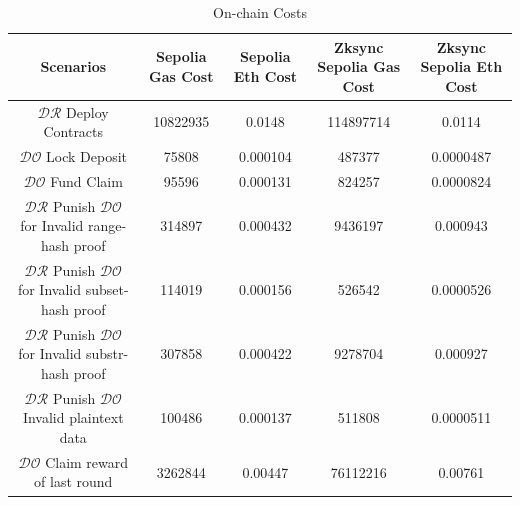 \documentclass[journal]{IEEEtran}
\begin{document}
\begin{table}[htbp]
    \centering
    \caption{On-chain Costs }
    \label{tab_gas_cost}
    \begin{tabular}{c|c|c|c|c}
    \hline
    Scenarios   & Sepolia Gas Cost & Sepolia Eth Cost & Zksync Sepolia Gas Cost & Zksync Sepolia Eth Cost \\
    \hline 

    $\mathcal{DR}$ Deploy Contracts & 10822935 & 0.0148 & 114897714 & 0.0114 \\

    $\mathcal{DO}$ Lock Deposit & 75808 & 0.000104 & 487377 & 0.0000487 \\

    $\mathcal{DO}$ Fund Claim & 95596 & 0.000131 & 824257 & 0.0000824 \\
      
    $\mathcal{DR}$ Punish $\mathcal{DO}$ for Invalid range-hash proof   & 314897 & 0.000432 & 9436197 & 0.000943 \\ 
    $\mathcal{DR}$ Punish $\mathcal{DO}$ for Invalid subset-hash proof   & 114019 & 0.000156 & 526542 & 0.0000526 \\ 
    $\mathcal{DR}$ Punish $\mathcal{DO}$ for Invalid substr-hash proof   & 307858 & 0.000422 & 9278704 & 0.000927 \\ 

    $\mathcal{DR}$ Punish $\mathcal{DO}$ Invalid plaintext data & 100486 & 0.000137 & 511808 & 0.0000511 \\

    $\mathcal{DO}$ Claim reward of last round & 3262844 & 0.00447 & 76112216 & 0.00761 \\
    
    \hline
    \end{tabular}

\end{table}
\end{document}

